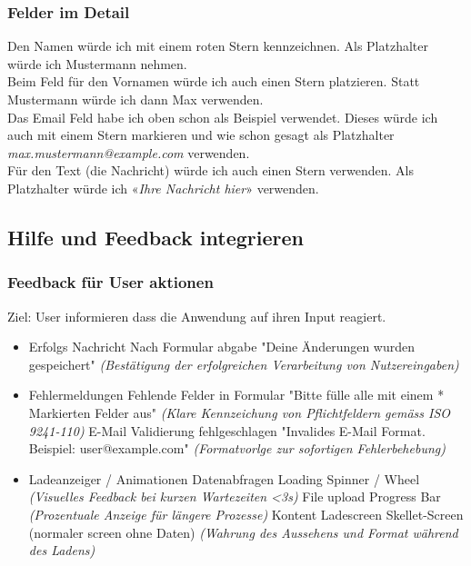 \documentclass[10pt]{article}
\begin{document}
	\subsubsection{Felder im Detail}
	Den Namen würde ich mit einem roten Stern kennzeichnen. Als Platzhalter würde ich Mustermann nehmen.\\
	Beim Feld für den Vornamen würde ich auch einen Stern platzieren. Statt Mustermann würde ich dann Max verwenden.\\
	Das Email Feld habe ich oben schon als Beispiel verwendet. Dieses würde ich auch mit einem Stern markieren und wie schon gesagt als Platzhalter \textit{max.mustermann@example.com} verwenden.\\
	Für den Text (die Nachricht) würde ich auch einen Stern verwenden. Als Platzhalter würde ich «\textit{Ihre Nachricht hier}» verwenden.
	
	\pagebreak
	
	\subsection{Hilfe und Feedback integrieren}
	
	\subsubsection{Feedback für User aktionen}
	
	Ziel: User informieren dass die Anwendung auf ihren Input reagiert.
	
	\begin{itemize}
		\item Erfolgs Nachricht
		\subitem Nach Formular abgabe
		\subsubitem "Deine Änderungen wurden gespeichert"
		\subsubitem \textit{(Bestätigung der erfolgreichen Verarbeitung von Nutzereingaben)}
		\item Fehlermeldungen
		\subitem Fehlende Felder in Formular
		\subsubitem "Bitte fülle alle mit einem * Markierten Felder aus"
		\subsubitem \textit{(Klare Kennzeichung von Pflichtfeldern gemäss ISO 9241-110)}
		\subitem E-Mail Validierung fehlgeschlagen
		\subsubitem "Invalides E-Mail Format. Beispiel: user@example.com"
		\subsubitem \textit{(Formatvorlge zur sofortigen Fehlerbehebung)}
		\item Ladeanzeiger / Animationen
		\subitem Datenabfragen
		\subsubitem Loading Spinner / Wheel
		\subsubitem \textit{(Visuelles Feedback bei kurzen Wartezeiten <3s)}
		\subitem File upload
		\subsubitem Progress Bar
		\subsubitem \textit{(Prozentuale Anzeige für längere Prozesse)}
		\subitem Kontent Ladescreen
		\subsubitem Skellet-Screen (normaler screen ohne Daten)
		\subsubitem \textit{(Wahrung des Aussehens und Format während des Ladens)}
	\end{itemize}
	
\end{document}
